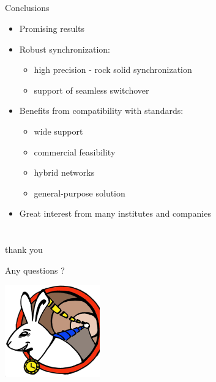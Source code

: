 \documentclass[compress,red]{beamer}
\begin{document}
\subsection{}
\begin{frame}{Conclusions}

    \begin{itemize}
	\item Promising results
	\item Robust synchronization:
	  \begin{itemize}
	    \item high precision - rock solid synchronization
	    \item support of seamless switchover 
	  \end{itemize}
	\item Benefits from compatibility with standards:
	  \begin{itemize}
	    \item wide support
	    \item commercial feasibility
	    \item hybrid networks
	    \item general-purpose solution
	  \end{itemize}
	\item Great interest from many institutes and companies	
      \end{itemize}


\end{frame}
\section{}
\begin{frame}{thank you}

    \begin{center}
    Any questions ?
    \end{center}

    
    \begin{center}
    \includegraphics[height=4.0cm]{../../figures/logo/WRlogo.ps}
    \end{center}

\end{frame}
\end{document}
